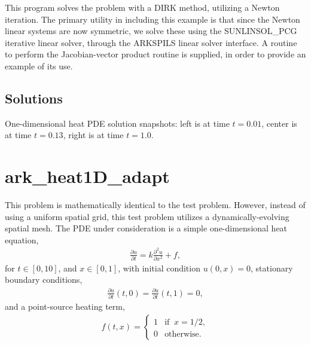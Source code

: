\documentclass[letterpaper,10pt,english]{sphinxmanual}
\begin{document}
This program solves the problem with a DIRK method, utilizing a Newton
iteration.  The primary utility in including this example is that
since the Newton linear systems are now symmetric, we solve these
using the SUNLINSOL\_PCG iterative linear solver, through the ARKSPILS
linear solver interface.  A routine to perform the Jacobian-vector
product routine is supplied, in order to provide an example of its use.


\subsection{Solutions}
\label{\detokenize{c_serial:id27}}
\noindent{}

\noindent{}

\noindent{}

One-dimensional heat PDE solution snapshots: left is at time \(t=0.01\),
center is at time \(t=0.13\), right is at time \(t=1.0\).


\section{ark\_heat1D\_adapt}
\label{\detokenize{c_serial:id28}}\label{\detokenize{c_serial:ark-heat1d-adapt}}
This problem is mathematically identical to the {\hyperref[\detokenize{c_serial:ark-heat1d}]{}} test
problem.  However, instead of using a uniform spatial grid, this test
problem utilizes a dynamically-evolving spatial mesh.  The PDE under
consideration is a simple one-dimensional heat equation,
\begin{equation*}
\begin{split}\frac{\partial u}{\partial t} = k \frac{\partial^2 u}{\partial x^2} + f,\end{split}
\end{equation*}
for \(t \in [0, 10]\), and \(x \in [0, 1]\), with initial
condition \(u(0,x) = 0\), stationary boundary conditions,
\begin{equation*}
\begin{split}\frac{\partial u}{\partial t}(t,0) = \frac{\partial u}{\partial t}(t,1) = 0,\end{split}
\end{equation*}
and a point-source heating term,
\begin{equation*}
\begin{split}f(t,x) = \begin{cases} 1 & \text{if}\;\; x=1/2, \\
                       0 & \text{otherwise}. \end{cases}\end{split}
\end{equation*}
\end{document}
